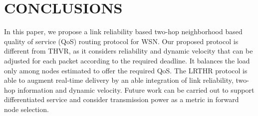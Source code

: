 \documentclass[fleqn,twoside]{article}
\begin{document}
 
 \section{CONCLUSIONS}
\label{section:conclusions}
In this paper, we propose a link reliability based two-hop neighborhood based quality of service (QoS) routing protocol for WSN.
Our proposed protocol is different from THVR, as it considers reliability and dynamic velocity that can be adjusted for each packet according to the required deadline. It balances the load only among nodes estimated to offer the required QoS.  The LRTHR protocol is able to augment real-time delivery by an able integration of link reliability, two-hop information and dynamic velocity. Future work 
can be carried out to support differentiated service and consider transmission power as a metric in forward node selection.





 \small
\balance
\end{document}
